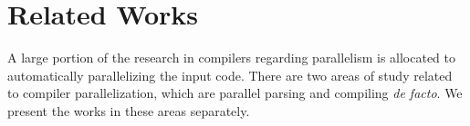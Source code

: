 
\newcommand{\sla}{\textbackslash}

\newcommand{\cmd}[1]{\textsf{#1}}

\newcommand{\pkg}[1]{\textsf{#1}}

\newcommand{\ltxcmd}[1]{\cmd{\sla{}#1}}

\chapter{Related Works}
\label{chap:related_works}

A large portion of the research in compilers regarding parallelism is allocated
to automatically parallelizing the input code. There are two areas of study
related to compiler parallelization, which are parallel parsing and
compiling \textit{de facto}. We present the works in these areas separately.


